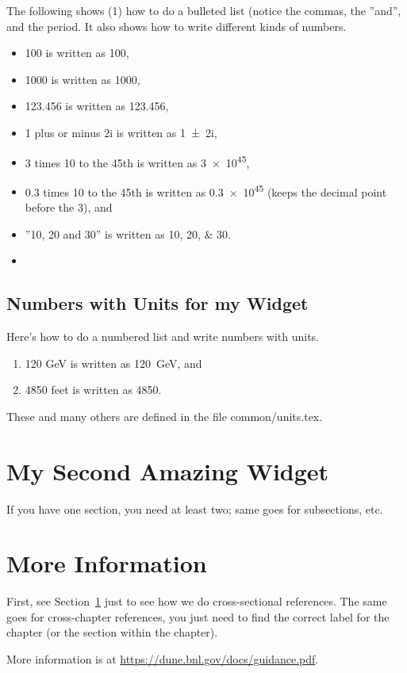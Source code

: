 The following shows (1) how to do a bulleted list (notice the commas, the ''and'', and the period.  It also shows how to write different kinds of numbers.

\begin{itemize}
    \item 100 is written as \num{100},
    \item 1000 is written as \num{1000},
    \item 123.456 is written as \num{123.456},
    \item 1 plus or minus 2i is written as \num{1+-2i},
    \item 3 times 10 to the 45th is written as \num{3e45},
    \item 0.3 times 10 to the 45th is written as \num{.3e45} (keeps the decimal point before the 3), and 
    \item ''10, 20 and 30'' is written as \numlist{10;20;30}.
    \item 
\end{itemize}

\subsection{Numbers with Units for my Widget}
\label{sec:chap-id:mywidget:numunit}

Here's how to do a numbered list and write numbers with units. 
\begin{enumerate}
    \item 120 GeV is written as \SI{120}{\GeV}, and
    \item 4850 feet is written as \SI{4850}{\ft}.
\end{enumerate}

These and many others are defined in the file common/units.tex.

\section{My Second Amazing Widget}
\label{sec:chap-id:my2ndwidget}

If you have one section, you need at least two; same goes for subsections, etc. 

\section{More Information}
\label{sec:chap-id:moreinfo}

First, see Section~\ref{sec:chap-id:my2ndwidget} just to see how we do cross-sectional references.  The same goes for cross-chapter references, you just need to find the correct label for the chapter (or the section within the chapter).

More information is at \url{https://dune.bnl.gov/docs/guidance.pdf}.
